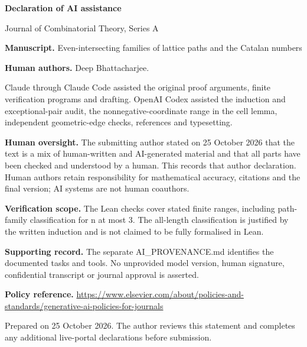 \documentclass[11pt]{article}
\begin{document}
{\Large\bfseries\color{ink} Declaration of AI assistance}\par
Journal of Combinatorial Theory, Series A\par{}\par\medskip
\textbf{Manuscript.} Even-intersecting families of lattice paths and the Catalan numbers\par

\textbf{Human authors.} Deep Bhattacharjee.\par

Claude through Claude Code assisted the original proof arguments, finite verification programs and drafting. OpenAI Codex assisted the induction and exceptional-pair audit, the nonnegative-coordinate range in the cell lemma, independent geometric-edge checks, references and typesetting.\par

\textbf{Human oversight.} The submitting author stated on 25 October 2026 that the text is a mix of human-written and AI-generated material and that all parts have been checked and understood by a human. This records that author declaration. Human authors retain responsibility for mathematical accuracy, citations and the final version; AI systems are not human coauthors.\par

\textbf{Verification scope.} The Lean checks cover stated finite ranges, including path-family classification for n at most 3. The all-length classification is justified by the written induction and is not claimed to be fully formalised in Lean.\par

\textbf{Supporting record.} The separate AI\_PROVENANCE.md identifies the documented tasks and tools. No unprovided model version, human signature, confidential transcript or journal approval is asserted.\par

\textbf{Policy reference.} \url{https://www.elsevier.com/about/policies-and-standards/generative-ai-policies-for-journals}\par

{\small Prepared on 25 October 2026. The author reviews this statement and completes any additional live-portal declarations before submission.}
\end{document}
